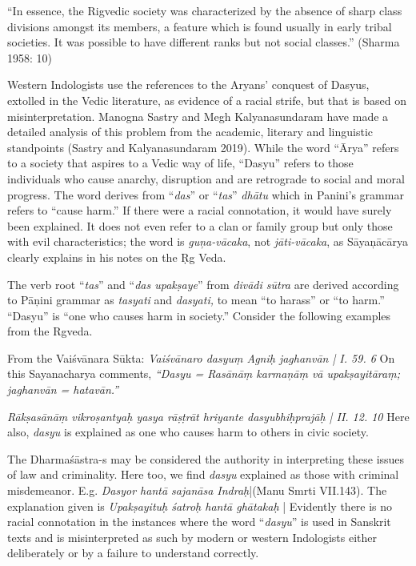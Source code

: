\begin{myquote}
“In essence, the Rigvedic society was characterized by the absence of sharp class divisions amongst its members, a feature which is found usually in early tribal societies. It was possible to have different ranks but not social classes.” (Sharma 1958: 10)
\end{myquote}

Western Indologists use the references to the Aryans' conquest of Dasyus, extolled in the Vedic literature, as evidence of a racial strife, but that is based on misinterpretation. Manogna Sastry and Megh Kalyanasundaram have made a detailed analysis of this problem from the academic, literary and linguistic standpoints (Sastry and Kalyanasundaram 2019). While the word “Ārya” refers to a society that aspires to a Vedic way of life, “Dasyu” refers to those individuals who cause anarchy, disruption and are retrograde to social and moral progress. The word derives from “\textit{das}” or “\textit{tas}” \textit{dhātu} which in Panini’s grammar refers to “cause harm.” If there were a racial connotation, it would have surely been explained. It does not even refer to a clan or family group but only those with evil characteristics; the word is \textit{guņa-vācaka}, not \textit{jāti-vācaka}, as Sāyaņācārya clearly explains in his notes on the Ṛg Veda.

The verb root “\textit{tas}” and “\textit{das upakṣaye}” from \textit{divādi sūtra} are derived according to Pāņini grammar as \textit{tasyati} and \textit{dasyati,} to mean “to harass” or “to harm.” “Dasyu” is “one who causes harm in society.” Consider the following examples from the Rgveda.

From the Vaiśvānara Sūkta: \textit{Vaiśvānaro dasyuṃ Agniḥ jaghanvān | I. 59. 6} On this Sayanacharya comments, \textit{“Dasyu = Rasānāṃ karmaņāṃ vā upakṣayitāraṃ; jaghanvān = hatavān.”}

\textit{Rākṣasānāṃ vikroṣantyaḥ yasya rāṣṭrāt hriyante dasyubhiḥprajāḥ | II. 12. 10} Here also, \textit{dasyu} is explained as one who causes harm to others in civic society.

The Dharmaśāstra-s may be considered the authority in interpreting these issues of law and criminality. Here too, we find \textit{dasyu} explained as those with criminal misdemeanor. E.g. \textit{Dasyor hantā sajanāsa Indraḥ}|(Manu Smrti VII.143). The explanation given is \textit{Upakṣayituḥ śatroḥ hantā ghātakaḥ} | Evidently there is no racial connotation in the instances where the word “\textit{dasyu}” is used in Sanskrit texts and is misinterpreted as such by modern or western Indologists either deliberately or by a failure to understand correctly.

